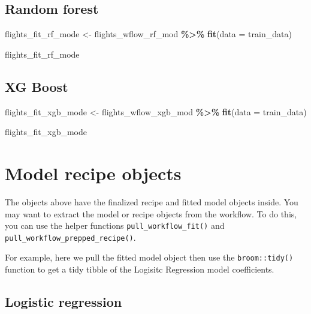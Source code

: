 \documentclass[
]{book}
\newenvironment{Shaded}{\begin{snugshade}}{\end{snugshade}}
\newcommand{\DataTypeTok}[1]{\textcolor[rgb]{0.13,0.29,0.53}{#1}}
\newcommand{\KeywordTok}[1]{\textcolor[rgb]{0.13,0.29,0.53}{\textbf{#1}}}
\newcommand{\NormalTok}[1]{#1}
\newcommand{\OperatorTok}[1]{\textcolor[rgb]{0.81,0.36,0.00}{\textbf{#1}}}
\newcommand{\StringTok}[1]{\textcolor[rgb]{0.31,0.60,0.02}{#1}}
\begin{document}
\hypertarget{random-forest-2}{%
\subsection{Random forest}\label{random-forest-2}}

\begin{Shaded}
\begin{Highlighting}[]
\NormalTok{flights\_fit\_rf\_mode \textless{}{-}}
\StringTok{  }\NormalTok{flights\_wflow\_rf\_mod }\OperatorTok{\%\textgreater{}\%}
\StringTok{  }\KeywordTok{fit}\NormalTok{(}\DataTypeTok{data =}\NormalTok{ train\_data)}

\NormalTok{flights\_fit\_rf\_mode}
\end{Highlighting}
\end{Shaded}

\hypertarget{xg-boost}{%
\subsection{XG Boost}\label{xg-boost}}

\begin{Shaded}
\begin{Highlighting}[]
\NormalTok{flights\_fit\_xgb\_mode \textless{}{-}}
\StringTok{  }\NormalTok{flights\_wflow\_xgb\_mod }\OperatorTok{\%\textgreater{}\%}
\StringTok{  }\KeywordTok{fit}\NormalTok{(}\DataTypeTok{data =}\NormalTok{ train\_data)}

\NormalTok{flights\_fit\_xgb\_mode}
\end{Highlighting}
\end{Shaded}

\hypertarget{model-recipe-objects}{%
\section{Model recipe objects}\label{model-recipe-objects}}

The objects above have the finalized recipe and fitted model objects inside. You may want to extract the model or recipe objects from the workflow. To do this, you can use the helper functions \texttt{pull\_workflow\_fit()} and \texttt{pull\_workflow\_prepped\_recipe()}.

For example, here we pull the fitted model object then use the \texttt{broom::tidy()} function to get a tidy tibble of the Logisitc Regression model coefficients.

\hypertarget{logistic-regression-3}{%
\subsection{Logistic regression}\label{logistic-regression-3}}
\end{document}

